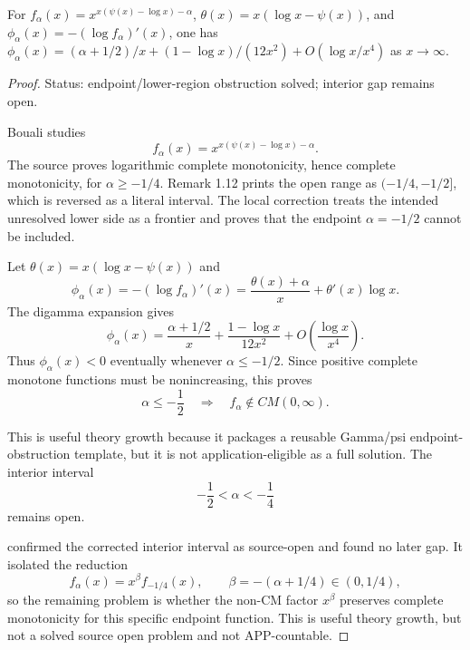 \begin{proposition}
\label{res:bouali-falpha-phi-asymptotic}
For \(f_\alpha(x)=x^{x(\psi(x)-\log x)-\alpha}\), \(\theta(x)=x(\log x-\psi(x))\), and \(\phi_\alpha(x)=-(\log f_\alpha)'(x)\), one has \(\phi_\alpha(x)=(\alpha+1/2)/x+(1-\log x)/(12x^2)+O(\log x/x^4)\) as \(x\to\infty\).
\end{proposition}
\begin{proof}
Status: endpoint/lower-region obstruction solved; interior gap remains open.

Bouali studies
\[
f_\alpha(x)=x^{x(\psi(x)-\log x)-\alpha}.
\]
The source proves logarithmic complete monotonicity, hence complete monotonicity, for \(\alpha\ge -1/4\). Remark 1.12 prints the open range as \((-1/4,-1/2]\), which is reversed as a literal interval. The local correction treats the intended unresolved lower side as a frontier and proves that the endpoint \(\alpha=-1/2\) cannot be included.

Let \(\theta(x)=x(\log x-\psi(x))\) and
\[
\phi_\alpha(x)=-(\log f_\alpha)'(x)=\frac{\theta(x)+\alpha}{x}+\theta'(x)\log x.
\]
The digamma expansion gives
\[
\phi_\alpha(x)=\frac{\alpha+1/2}{x}+\frac{1-\log x}{12x^2}+O\!\left(\frac{\log x}{x^4}\right).
\]
Thus \(\phi_\alpha(x)<0\) eventually whenever \(\alpha\le -1/2\). Since positive complete monotone functions must be nonincreasing, this proves
\[
\alpha\le -\frac12 \quad\Longrightarrow\quad f_\alpha\notin CM(0,\infty).
\]

This is useful theory growth because it packages a reusable Gamma/psi endpoint-obstruction template, but it is not application-eligible as a full solution. The interior interval
\[
-\frac12<\alpha<-\frac14
\]
remains open.

confirmed the corrected interior interval as source-open and found no later
gap. It isolated the reduction
\[
f_\alpha(x)=x^\beta f_{-1/4}(x),
\qquad
\beta=-(\alpha+1/4)\in(0,1/4),
\]
so the remaining problem is whether the non-CM factor \(x^\beta\) preserves
complete monotonicity for this specific endpoint function. This is useful
theory growth, but not a solved source open problem and not APP-countable.
\end{proof}

